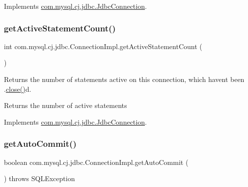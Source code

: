 Implements \mbox{\hyperlink{interfacecom_1_1mysql_1_1cj_1_1jdbc_1_1_jdbc_connection_aa5b980c79d1c7d58535c5c469e3d4f24}{com.\+mysql.\+cj.\+jdbc.\+Jdbc\+Connection}}.

\mbox{\label{classcom_1_1mysql_1_1cj_1_1jdbc_1_1_connection_impl_a858f89a9745e2ffc3e748c91286d7862}} 
\subsubsection{\texorpdfstring{get\+Active\+Statement\+Count()}{getActiveStatementCount()}}
{\footnotesize\ttfamily int com.\+mysql.\+cj.\+jdbc.\+Connection\+Impl.\+get\+Active\+Statement\+Count (\begin{DoxyParamCaption}{ }\end{DoxyParamCaption})}

Returns the number of statements active on this connection, which haven\textquotesingle{}t been .\mbox{\hyperlink{classcom_1_1mysql_1_1cj_1_1jdbc_1_1_connection_impl_a9d82246a207b618a8ce3dfcf349c971d}{close()}}d.

\begin{DoxyReturn}{Returns}
the number of active statements 
\end{DoxyReturn}


Implements \mbox{\hyperlink{interfacecom_1_1mysql_1_1cj_1_1jdbc_1_1_jdbc_connection_aea218879f6bae7ed7717a257876582db}{com.\+mysql.\+cj.\+jdbc.\+Jdbc\+Connection}}.

\mbox{\label{classcom_1_1mysql_1_1cj_1_1jdbc_1_1_connection_impl_a9c1ff3f925f011a393add7da7dae1871}} 
\subsubsection{\texorpdfstring{get\+Auto\+Commit()}{getAutoCommit()}}
{\footnotesize\ttfamily boolean com.\+mysql.\+cj.\+jdbc.\+Connection\+Impl.\+get\+Auto\+Commit (\begin{DoxyParamCaption}{ }\end{DoxyParamCaption}) throws S\+Q\+L\+Exception}

